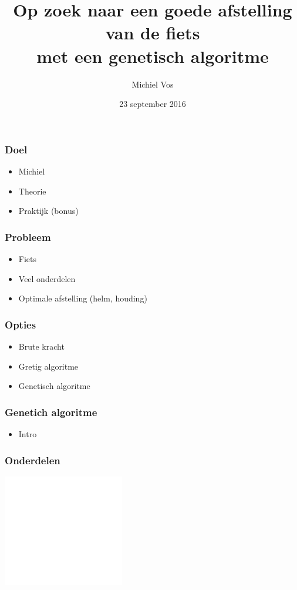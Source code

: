 \documentclass{beamer}
\title{Op zoek naar een goede afstelling van de fiets\\
met een genetisch algoritme}
\author{Michiel Vos}
\date{23 september 2016}
\begin{document}
\begin{frame}
  \titlepage
\end{frame}

\begin{frame}
  \frametitle{Doel}
  \begin{itemize}
      \item Michiel
      \item Theorie
      \item Praktijk (bonus)
  \end{itemize}
\end{frame}

\begin{frame}
  \frametitle{Probleem}
  \begin{itemize}
      \item Fiets 
      \item Veel onderdelen
      \item Optimale afstelling (helm, houding)
  \end{itemize}
\end{frame}

\begin{frame}
  \frametitle{Opties}
  \begin{itemize}
      \item Brute kracht
      \item Gretig algoritme
      \item Genetisch algoritme
  \end{itemize}
\end{frame}

\begin{frame}
  \frametitle{Genetich algoritme}
  \begin{itemize}
      \item Intro
  \end{itemize}
\end{frame}

\begin{frame}
  \frametitle{Onderdelen}
  \begin{center}
    \includegraphics[width=200px]{michiel.png}
  \end{center}
\end{frame}
\end{document}
